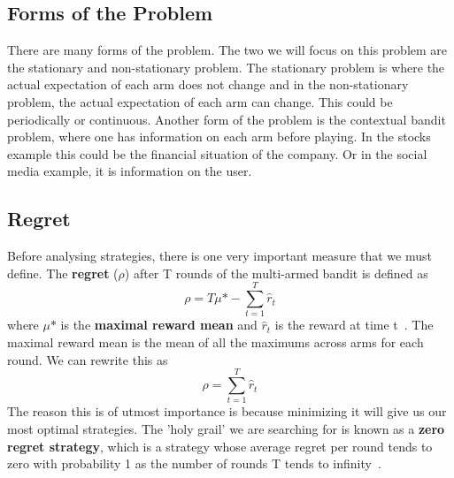 \subsection{Forms of the Problem}\label{subsec:forms-of-the-problem}
There are many forms of the problem.
The two we will focus on this problem are the stationary and non-stationary problem.
The stationary problem is where the actual expectation of each arm does not change and in the non-stationary problem, the actual expectation of each arm can change.
This could be periodically or continuous.
Another form of the problem is the contextual bandit problem, where one has information on each arm before playing.
In the stocks example this could be the financial situation of the company.
Or in the social media example, it is information on the user.

\subsection{Regret}\label{subsec:regret}
Before analysing strategies, there is one very important measure that we must define.
The \textbf{regret} ($\rho$) after T rounds of the multi-armed bandit is defined as \[\rho = T\mu\mbox{*} - \sum_{t=1}^T\hat{r}_t\] where $\mu\mbox{*}$ is the \textbf{maximal reward mean} and $\hat{r}_t$ is the reward at time t~\citep{vermorel}.
The maximal reward mean is the mean of all the maximums across arms for each round.
We can rewrite this as \[\rho = \sum_{t=1}^T\hat{r}_t\] The reason this is of utmost importance is because minimizing it will give us our most optimal strategies.
The 'holy grail' we are searching for is known as a \textbf{zero regret strategy}, which is a strategy whose average regret per round tends to zero with probability 1 as the number of rounds T tends to infinity~\citep{vermorel}.
